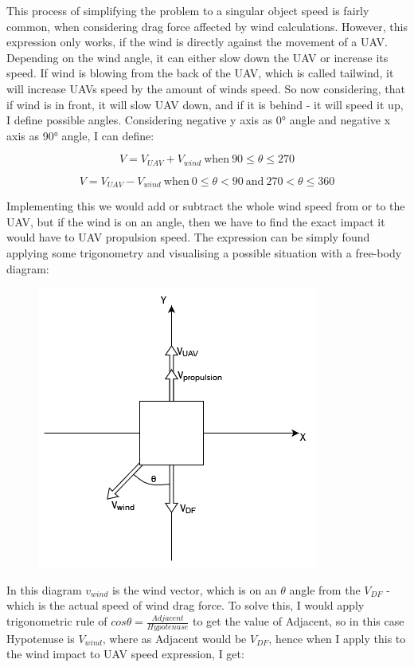 \documentclass[11pt,a4paper,footinclude=true,headinclude=true, oneside]{scrbook}
\begin{document}
This process of simplifying the problem to a singular object speed is fairly common, when considering drag force affected by wind calculations. However, this expression only works, if the wind is directly against the movement of a UAV. Depending on the wind angle, it can either slow down the UAV or increase its speed. If wind is blowing from the back of the UAV, which is called tailwind, it will increase UAVs speed by the amount of winds speed. So now considering, that if wind is in front, it will slow UAV down, and if it is behind - it will speed it up, I define possible angles. Considering negative y axis as 0° angle and negative x axis as 90° angle, I can define:

\[V = V_{UAV} + V_{wind}\ \textrm{when}\ 90 \leq \theta \leq 270\]

\[V = V_{UAV} - V_{wind}\ \textrm{when}\ 0 \leq \theta < 90\ \textrm{and}\ 270 < \theta \leq 360\]

Implementing this we would add or subtract the whole wind speed from or to the UAV, but if the wind is on an angle, then we have to find the exact impact it would have to UAV propulsion speed. The expression can be simply found applying some trigonometry and visualising a possible situation with a free-body diagram:

\begin{figure}[h]
\includegraphics[scale=0.7]{UAV_against_wind_angle.png}
\centering
\end{figure}

In this diagram \(v_{wind}\) is the wind vector, which is on an \(\theta\) angle from the \(V_{DF}\) - which is the actual speed of wind drag force. To solve this, I would apply trigonometric rule of \(cos\theta = \frac{Adjacent}{Hypotenuse}\) to get the value of Adjacent, so in this case Hypotenuse is \(V_{wind}\), where as Adjacent would be \(V_{DF}\), hence when I apply this to the wind impact to UAV speed expression, I get:
\end{document}
